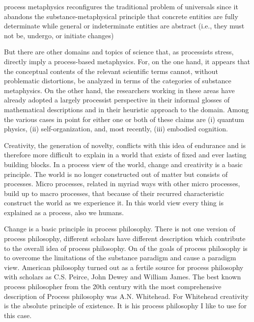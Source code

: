 process metaphysics reconfigures the traditional problem of universals since it abandons the substance-metaphysical principle that concrete entities are fully determinate while general or indeterminate entities are abstract (i.e., they must not be, undergo, or initiate changes)

But there are other domains and topics of science that, as processists stress, directly imply a process-based metaphysics. For, on the one hand, it appears that the conceptual contents of the relevant scientific terms cannot, without problematic distortions, be analyzed in terms of the categories of substance metaphysics. On the other hand, the researchers working in these areas have already adopted a largely processist perspective in their informal glosses of mathematical descriptions and in their heuristic approach to the domain. Among the various cases in point for either one or both of these claims are (i) quantum physics, (ii) self-organization, and, most recently, (iii) embodied cognition.

Creativity, the generation of novelty, conflicts with this idea of endurance and is therefore more difficult to explain in a world that exists of fixed and ever lasting building blocks.
In a process view of the world, change and creativity is a basic principle. The world is no longer constructed out of matter but consists of processes. Micro processes, related in myriad ways with other micro processes, build up to macro processes, that because of their recurred characteristic construct the world as we experience it. In this world view every thing is explained as a process, also we humans. 

Change is a basic principle in process philosophy. There is not one version of process philosophy, different scholars have different description which contribute to the overall idea of process philosophy.
On of the goals of process philosophy is to overcome the limitations of the substance paradigm and cause a paradigm view.
American philosophy turned out as a fertile source for process philosophy with scholars as C.S. Peirce, John Dewey and William James. The best known process philosopher from the 20th century with the most comprehensive description of Process philosophy was A.N. Whitehead. For Whitehead creativity is the absolute principle of existence. It is his process philosophy I like to use for this case.

